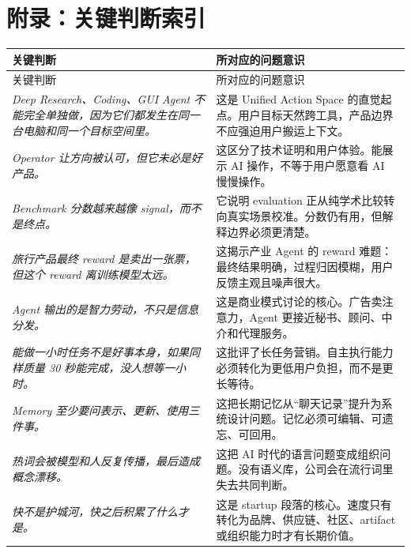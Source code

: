 \section*{附录：关键判断索引}

\begin{longtable}{>{\raggedright\arraybackslash}p{} >{\raggedright\arraybackslash}p{}}
\toprule
关键判断 & 所对应的问题意识 \\
\midrule
\endfirsthead
\toprule
关键判断 & 所对应的问题意识 \\
\midrule
\endhead
\textit{Deep Research、Coding、GUI Agent 不能完全单独做，因为它们都发生在同一台电脑和同一个目标空间里。} & 这是 Unified Action Space 的直觉起点。用户目标天然跨工具，产品边界不应强迫用户搬运上下文。 \\
\textit{Operator 让方向被认可，但它未必是好产品。} & 这区分了技术证明和用户体验。能展示 AI 操作，不等于用户愿意看 AI 慢慢操作。 \\
\textit{Benchmark 分数越来越像 signal，而不是终点。} & 它说明 evaluation 正从纯学术比较转向真实场景校准。分数仍有用，但解释边界必须更清楚。 \\
\textit{旅行产品最终 reward 是卖出一张票，但这个 reward 离训练模型太远。} & 这揭示产业 Agent 的 reward 难题：最终结果明确，过程归因模糊，用户反馈主观且噪声很大。 \\
\textit{Agent 输出的是智力劳动，不只是信息分发。} & 这是商业模式讨论的核心。广告卖注意力，Agent 更接近秘书、顾问、中介和代理服务。 \\
\textit{能做一小时任务不是好事本身，如果同样质量 30 秒能完成，没人想等一小时。} & 这批评了长任务营销。自主执行能力必须转化为更低用户负担，而不是更长等待。 \\
\textit{Memory 至少要问表示、更新、使用三件事。} & 这把长期记忆从“聊天记录”提升为系统设计问题。记忆必须可编辑、可遗忘、可回用。 \\
\textit{热词会被模型和人反复传播，最后造成概念漂移。} & 这把 AI 时代的语言问题变成组织问题。没有语义库，公司会在流行词里失去共同判断。 \\
\textit{快不是护城河，快之后积累了什么才是。} & 这是 startup 段落的核心。速度只有转化为品牌、供应链、社区、artifact 或组织能力时才有长期价值。 \\
\bottomrule
\end{longtable}


